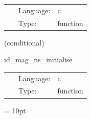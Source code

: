 \hspace{5mm}{\it check parameters } 


\hspace{5mm}

 \begin{tabular*}{160mm}{cll} 
~ & Language:  & c \\ 
~ & Type:  & function \\ 
\end{tabular*} 


\vspace{5mm}

   (conditional) 

\hspace{5mm} id\_mag\_ns\_initialise 

\hspace{5mm}{\it set up magnetised neutron star initial data } 


\hspace{5mm}

 \begin{tabular*}{160mm}{cll} 
~ & Language:  & c \\ 
~ & Type:  & function \\ 
\end{tabular*} 



\vspace{5mm}\parskip = 10pt 

